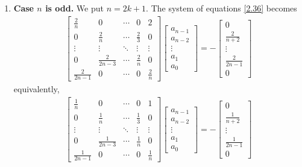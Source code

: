 \documentclass[a4paper]{article}
\numberwithin{equation}{section}
\begin{document}
\begin{enumerate}
\begin{align}
{\begin{array}{*{20}{c}}
0\\
 \vdots \\
{\frac{1}{{2n - 1}}}\\
0
\end{array}} \right]
\end{align}
\item \textbf{Case $n$ is odd.} We put $n=2k+1$. The system of equations \eqref{2.36} becomes
\begin{align}
\left[ {\begin{array}{*{20}{c}}
{\frac{2}{n}}&0& \cdots &0&2\\
0&{\frac{2}{n}}& \cdots &{\frac{2}{3}}&0\\
 \vdots & \vdots & \ddots & \vdots & \vdots \\
0&{\frac{2}{{2n - 3}}}& \cdots &{\frac{2}{n}}&0\\
{\frac{2}{{2n - 1}}}&0& \cdots &0&{\frac{2}{n}}
\end{array}} \right]\left[ {\begin{array}{*{20}{c}}
{{a_{n - 1}}}\\
{{a_{n - 2}}}\\
 \vdots \\
{{a_1}}\\
{{a_0}}
\end{array}} \right] =  - \left[ {\begin{array}{*{20}{c}}
0\\
{\frac{2}{{n + 2}}}\\
 \vdots \\
{\frac{2}{{2n - 1}}}\\
0
\end{array}} \right]
\end{align}
equivalently,
\begin{align}
\left[ {\begin{array}{*{20}{c}}
{\frac{1}{n}}&0& \cdots &0&1\\
0&{\frac{1}{n}}& \cdots &{\frac{1}{3}}&0\\
 \vdots & \vdots & \ddots & \vdots & \vdots \\
0&{\frac{1}{{2n - 3}}}& \cdots &{\frac{1}{n}}&0\\
{\frac{1}{{2n - 1}}}&0& \cdots &0&{\frac{1}{n}}
\end{array}} \right]\left[ {\begin{array}{*{20}{c}}
{{a_{n - 1}}}\\
{{a_{n - 2}}}\\
 \vdots \\
{{a_1}}\\
{{a_0}}
\end{array}} \right] =  - \left[ {\begin{array}{*{20}{c}}
0\\
{\frac{1}{{n + 2}}}\\
 \vdots \\
{\frac{1}{{2n - 1}}}\\
0
\end{array}} \right]
\end{align}
\end{enumerate}
\end{document}

